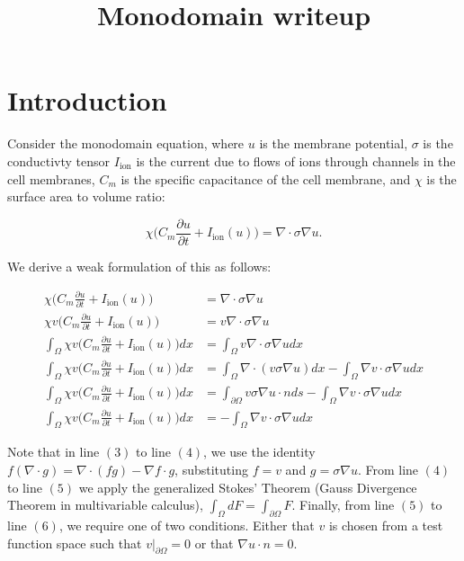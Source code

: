 \documentclass[format=acmsmall,screen,timestamp=false,a4paper]{acmart}
\title{Monodomain writeup}
\begin{document}
\maketitle

\section{Introduction}

Consider the monodomain equation, where $u$ is the membrane potential, $\sigma$ is the conductivty tensor $I_\text{ion}$ is the current due to flows of ions through channels in the cell membranes, $C_m$ is the specific capacitance of the cell membrane, and $\chi$ is the surface area to volume ratio:

\[ \chi \big(C_m \frac{\partial u}{\partial t} + I_{\text{ion}}(u) \big) = \nabla \cdot \sigma \nabla u. \]

We derive a weak formulation of this as follows:

\begin{align}
    \chi \big(C_m \frac{\partial u}{\partial t} + I_{\text{ion}}(u) \big) &= \nabla \cdot \sigma \nabla u \\
    \chi v \big(C_m \frac{\partial u}{\partial t} + I_{\text{ion}}(u) \big) &= v \nabla \cdot \sigma \nabla u\\
    \int_\Omega \chi v \big(C_m \frac{\partial u}{\partial t} + I_{\text{ion}}(u) \big) dx &= \int_\Omega v \nabla \cdot \sigma \nabla u dx\\
    \int_\Omega \chi v \big(C_m \frac{\partial u}{\partial t} + I_{\text{ion}}(u) \big) dx &= \int_\Omega \nabla \cdot (v \sigma \nabla u) dx - \int_\Omega \nabla v \cdot \sigma \nabla u dx\\
    \int_\Omega \chi v \big(C_m \frac{\partial u}{\partial t} + I_{\text{ion}}(u) \big) dx &= \int_{\partial \Omega} v \sigma \nabla u \cdot n ds - \int_\Omega \nabla v \cdot \sigma \nabla u dx\\
    \int_\Omega \chi v \big(C_m \frac{\partial u}{\partial t} + I_{\text{ion}}(u) \big) dx &= - \int_\Omega  \nabla v \cdot \sigma \nabla u dx
\end{align}

Note that in line $(3)$ to line $(4)$, we use the identity $f (\nabla \cdot g) = \nabla \cdot (fg) - \nabla f \cdot g$, substituting $f = v$ and $g = \sigma \nabla u$.  From line $(4)$ to line $(5)$ we apply the generalized Stokes' Theorem (Gauss Divergence Theorem in multivariable calculus), $\int_\Omega d F = \int_{\partial \Omega} F $.  Finally, from line $(5)$ to line $(6)$, we require one of two conditions.  Either that $v$ is chosen from a test function space such that $v \vert_{\partial \Omega} = 0$ or that $\nabla u \cdot n = 0$.  
\end{document}

